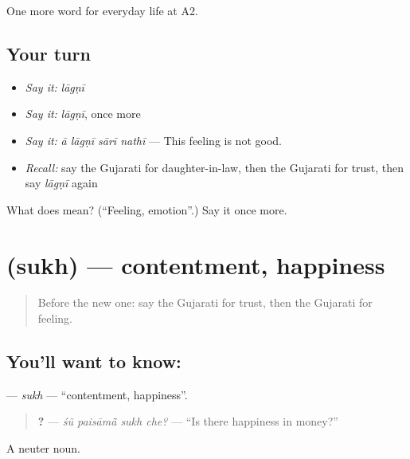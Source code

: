 \begin{grammarlens}[title={What you've built}]
One more word for everyday life at A2.
\end{grammarlens}

\subsection*{Your turn}
\begin{itemize}
\raggedright
  \item \emph{Say it:} \emph{lāgṇī}
  \item \emph{Say it:} \emph{lāgṇī}, once more
  \item \emph{Say it:} \emph{ā lāgṇī sārī nathī} — This feeling is not good.
  \item \emph{Recall:} say the Gujarati for daughter-in-law, then the Gujarati for trust, then say \emph{lāgṇī} again
\end{itemize}

\begin{tcolorbox}[breakable,colback=teal!4,colframe=teal!35!black,title={Before you move on}]
What does  mean? (\textquotedblleft{}Feeling, emotion\textquotedblright{}.) Say it once more.
\end{tcolorbox}
\section[\texorpdfstring{\gu{સુખ} (sukh)}{સુખ (sukh)}]{ (sukh) — contentment, happiness}

\label{lesson:GU-C266-sukh}



\begin{quote}
Before the new one: say the Gujarati for trust, then the Gujarati for feeling.
\end{quote}

\subsection*{You'll want to know: }
\textbf{} — \emph{sukh} — \textquotedblleft{}contentment, happiness\textquotedblright{}.

\begin{quote}
\textbf{   ?} — \emph{śũ paisāmā̃ sukh che?} — \textquotedblleft{}Is there happiness in money?\textquotedblright{}
\end{quote}

A neuter noun.

